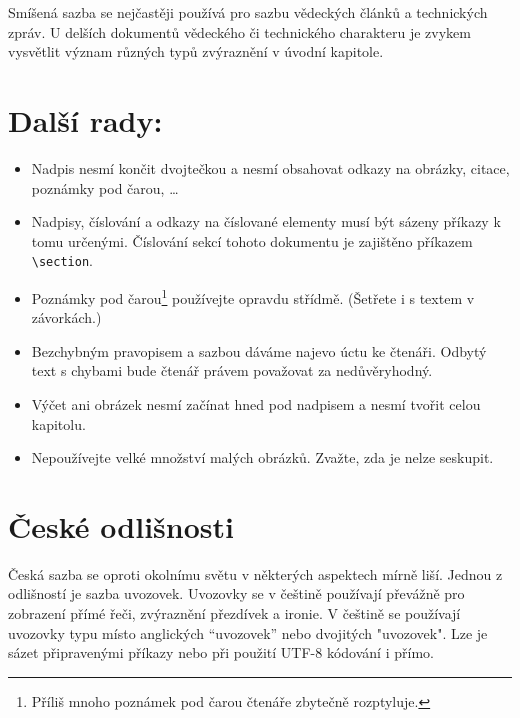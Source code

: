 \documentclass[a4paper, 10pt, twocolumn, final]{article}
\begin{document}
Smíšená sazba se nejčastěji používá pro sazbu vědeckých článků a technických zpráv.
U delších dokumentů vědeckého či technického charakteru je zvykem vysvětlit význam různých typů zvýraznění v úvodní kapitole.

\section{Další rady:}

\begin{itemize}
\item Nadpis nesmí končit dvojtečkou a nesmí obsahovat odkazy na obrázky, citace, poznámky pod čarou, \dots

\item Nadpisy, číslování a odkazy na číslované elementy musí být sázeny příkazy k tomu určenými.
Číslování sekcí tohoto dokumentu je zajištěno příkazem \verb|\section|.

\item Poznámky pod čarou\footnote{Příliš mnoho poznámek pod čarou čtenáře zbytečně rozptyluje.} používejte opravdu střídmě.
(Šetřete i s textem v závorkách.)

\item Bezchybným pravopisem a sazbou dáváme najevo úctu ke čtenáři.
Odbytý text s chybami bude čtenář právem považovat za nedůvěryhodný.

\item Výčet ani obrázek nesmí začínat hned pod nadpisem a nesmí tvořit celou kapitolu.

\item Nepoužívejte velké množství malých obrázků.
Zvažte, zda je nelze seskupit.
\end{itemize}

\section{České odlišnosti}

Česká sazba se oproti okolnímu světu v některých aspektech mírně liší.
Jednou z odlišností je sazba uvozovek.
Uvozovky se v češtině používají převážně pro zobrazení přímé řeči, zvýraznění přezdívek a ironie.
V češtině se používají uvozovky typu  místo anglických ``uvozovek'' nebo dvojitých "uvozovek".
Lze je sázet připravenými příkazy nebo při použití UTF-8 kódování i přímo.
\end{document}
